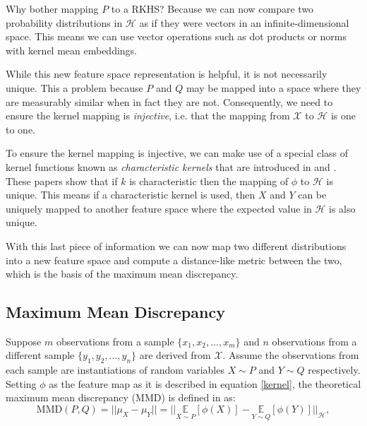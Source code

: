Why bother mapping $P$ to a RKHS? Because we can now compare two probability distributions in $\mathcal{H}$ as if they were vectors in an infinite-dimensional space. This means we can use vector operations such as dot products or norms with kernel mean embeddings.

While this new feature space representation is helpful, it is not necessarily unique. This a problem because $P$ and $Q$ may be mapped into a space where they are measurably similar when in fact they are not. Consequently, we need to ensure the kernel mapping is \textit{injective}, i.e. that the mapping from $\mathcal{X}$ to  $\mathcal{H}$ is one to one. %

To ensure the kernel mapping is injective, we can make use of a special class of kernel functions known as \textit{characteristic kernels} that are introduced in \cite{fukumizu2008kernel} and \cite{sriperumbudur2011universality}. These papers show that if $k$ is characteristic then the mapping of $\phi$ to $\mathcal{H}$ is unique. This means if a characteristic kernel is used, then $X$ and $Y$ can be uniquely mapped to another feature space where the expected value in $\mathcal{H}$ is also unique. 

With this last piece of information we can now map two different distributions into a new feature space and compute a distance-like metric between the two, which is the basis of the maximum mean discrepancy.   %

\subsection{Maximum Mean Discrepancy}
Suppose $m$ observations from a sample $\{x_1, x_2, ..., x_m\}$ and $n$ observations from a different sample $\{y_1, y_2, ..., y_n\}$ are derived from $\mathcal{X}$. Assume the observations from each sample are instantiations of random variables $X \sim  P$ and $Y \sim Q$ respectively. Setting $\phi$ as the feature map as it is described in equation \ref{kernel}, the theoretical maximum mean discrepancy (MMD) is defined in \cite{smola2007hilbert} as:
\begin{equation}
\label{mmd_theory}
\text{MMD}(P,Q)=||\mu_X - \mu_Y ||=|| \underset{X \sim P}{\mathbb{E}}[\phi(X)] -  \underset{Y \sim Q}{\mathbb{E}}[\phi(Y)]||_\mathcal{H},
\end{equation}

